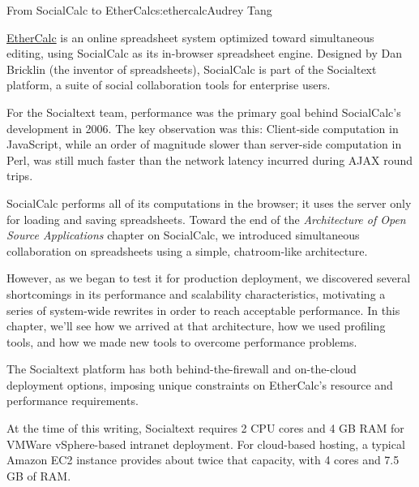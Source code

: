 \begin{aosachapter}{From SocialCalc to EtherCalc}{s:ethercalc}{Audrey Tang}

\href{http://ethercalc.net/}{EtherCalc} is an online spreadsheet system
optimized toward simultaneous editing, using SocialCalc as its
in-browser spreadsheet engine. Designed by Dan Bricklin (the inventor of
spreadsheets), SocialCalc is part of the Socialtext platform, a suite of
social collaboration tools for enterprise users.

For the Socialtext team, performance was the primary goal behind
SocialCalc's development in 2006. The key observation was this:
Client-side computation in JavaScript, while an order of magnitude
slower than server-side computation in Perl, was still much faster than
the network latency incurred during AJAX round trips.


SocialCalc performs all of its computations in the browser; it uses the
server only for loading and saving spreadsheets. Toward the end of the
\emph{Architecture of Open Source Applications} \cite{BrownWilson2011ArchOSS} chapter on SocialCalc, we introduced
simultaneous collaboration on spreadsheets using a simple,
chatroom-like architecture.


However, as we began to test it for production deployment, we discovered
several shortcomings in its performance and scalability characteristics,
motivating a series of system-wide rewrites in order to reach acceptable
performance. In this chapter, we'll see how we arrived at that
architecture, how we used profiling tools, and how we made new tools to
overcome performance problems.


The Socialtext platform has both behind-the-firewall and on-the-cloud
deployment options, imposing unique constraints on EtherCalc's resource
and performance requirements.

At the time of this writing, Socialtext requires 2 CPU cores and 4 GB
RAM for VMWare vSphere-based intranet deployment. For cloud-based
hosting, a typical Amazon EC2 instance provides about twice that
capacity, with 4 cores and 7.5 GB of RAM.


\end{aosachapter}
